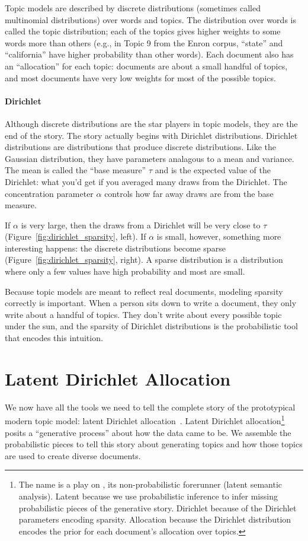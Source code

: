 Topic models are described by discrete distributions (sometimes called
multinomial distributions) over words and topics.  The distribution
over words is called the topic distribution; each of the topics gives
higher weights to some words more than others (e.g., in Topic 9 from
the Enron corpus, ``state'' and ``california'' have higher probability
than other words).  Each document also has an ``allocation'' for each
topic: documents are about a small handful of topics, and most
documents have very low weights for most of the possible topics.

\paragraph{Dirichlet}

Although discrete distributions are the star players in topic models, they are
the end of the story.  The story actually begins with Dirichlet distributions.
Dirichlet distributions are distributions that produce discrete distributions.
Like the Gaussian distribution, they have parameters analagous to a mean and
variance.  The mean is called the ``base measure'' $\tau$ and is the expected
value of the Dirichlet: what you'd get if you averaged many draws from the
Dirichlet.  The concentration parameter $\alpha$ controls how far away draws are
from the base measure.

If $\alpha$ is very large, then the draws from a Dirichlet will be very close to
$\tau$ (Figure~\ref{fig:dirichlet_sparsity}, left).  If $\alpha$ is small, however,
something more interesting happens: the discrete distributions become sparse
(Figure~\ref{fig:dirichlet_sparsity}, right).  A sparse distribution is a
distribution where only a few values have high probability and most are small.

Because topic models are meant to reflect real documents, modeling sparsity
correctly is important.  When a person sits down to write a document, they only
write about a handful of topics.  They don't write about every possible topic
under the sun, and the sparsity of Dirichlet distributions is the probabilistic
tool that encodes this intuition.

\section{Latent Dirichlet Allocation}

We now have all the tools we need to tell the complete story of the prototypical
modern topic model: latent Dirichlet allocation~\citep{blei-03}.  Latent
Dirichlet allocation\footnote{The name  is a play on , its
  non-probabilistic forerunner (latent semantic analysis).  Latent because we
  use probabilistic inference to infer missing probabilistic pieces of the
  generative story.  Dirichlet because of the Dirichlet parameters encoding
  sparsity.  Allocation because the Dirichlet distribution encodes the prior for
  each document's allocation over topics.} posits a ``generative process'' about
how the data came to be.  We assemble the probabilistic pieces to tell
this story about generating topics and how those topics are used to create
diverse documents.

